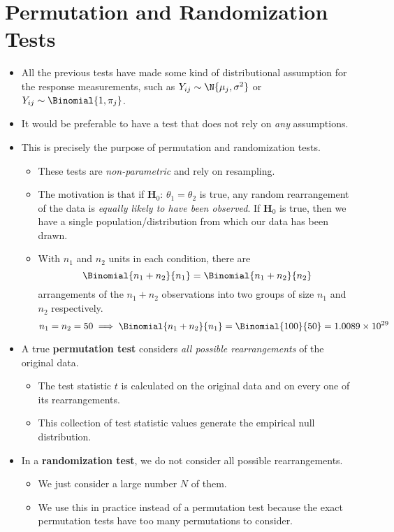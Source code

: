 \section{Permutation and Randomization Tests}
\begin{itemize}
    \item All the previous tests have made some kind of distributional assumption
          for the response measurements, such as $ Y_{ij} \sim \N{\mu_j,\sigma^2} $ or
          $ Y_{ij}\sim \Binomial{1,\pi_j} $.
    \item It would be preferable to have a test that does not rely on \emph{any}
          assumptions.
    \item This is precisely the purpose of permutation and randomization tests.
          \begin{itemize}
              \item These tests are \emph{non-parametric} and rely on resampling.
              \item The motivation is that if $ \mathbf{H}_0 $: $ \theta_1=\theta_2 $
                    is true, any random rearrangement of the data is \emph{equally likely
                        to have been observed}. If $ \mathbf{H}_0 $ is true, then we have a single population/distribution
                    from which our data has been drawn.
              \item With $ n_1 $ and $ n_2 $ units in each condition, there are
                    \[ \Binomial{n_1+n_2}{n_1}=\Binomial{n_1+n_2}{n_2} \]
                    arrangements of the $ n_1+n_2 $ observations into two groups of size $ n_1 $
                    and $ n_2 $ respectively.
                    \[ n_1=n_2=50\implies\Binomial{n_1+n_2}{n_1}=\Binomial{100}{50}=1.0089\times 10^{29} \]
          \end{itemize}
    \item A true \textbf{permutation test} considers \emph{all possible rearrangements}
          of the original data.
          \begin{itemize}
              \item The test statistic $ t $ is calculated on the original data and on every one of
                    its rearrangements.
              \item This collection of test statistic values generate the empirical null distribution.
          \end{itemize}
    \item In a \textbf{randomization test}, we do not
          consider all possible rearrangements.
          \begin{itemize}
              \item We just consider a large number $ N $ of them.
              \item We use this in practice instead of a permutation test because
                    the exact permutation tests have too many permutations to consider.
          \end{itemize}
\end{itemize}
